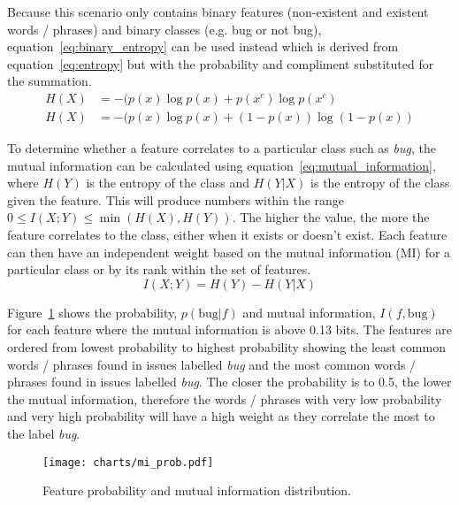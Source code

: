 Because this scenario only contains binary features (non-existent and existent words / phrases) and binary classes
(e.g. bug or not bug), equation~\ref{eq:binary_entropy} can be used instead which is derived from equation~\ref{eq:entropy} but
with the probability and compliment substituted for the summation.
\begin{equation}
    \label{eq:binary_entropy}
    \begin{split}
        H(X) &= -(p(x) \log p(x) + p(x^c)     \log p(x^c)    \\
        H(X) &= -(p(x) \log p(x) + (1 - p(x)) \log(1 - p(x))
    \end{split}
\end{equation}

To determine whether a feature correlates to a particular class such as \textit{bug}, the mutual information can be calculated
using equation~\ref{eq:mutual_information}, where $H(Y)$ is the entropy of the class and $H(Y|X)$ is the entropy of the class
given the feature. This will produce numbers within the range $0 \leq I(X;Y) \leq \min(H(X), H(Y))$. The higher the value, the
more the feature correlates to the class, either when it exists or doesn't exist. Each feature can then have an independent
weight based on the mutual information (MI) for a particular class or by its rank within the set of features.
\begin{equation}
    \label{eq:mutual_information}
    I(X;Y) = H(Y) - H(Y|X)
\end{equation}

Figure~\ref{fig:mi_prob} shows the probability, $p(\mathrm{bug}|f)$ and mutual information, $I(f,\mathrm{bug})$ for each feature
where the mutual information is above 0.13 bits. The features are ordered from lowest probability to highest probability showing
the least common words / phrases found in issues labelled \textit{bug} and the most common words / phrases found in issues
labelled \textit{bug}. The closer the probability is to 0.5, the lower the mutual information, therefore the words / phrases
with very low probability and very high probability will have a high weight as they correlate the most to the label
\textit{bug}.
\begin{figure}[h]
    \centering
    \texttt{[image: charts/mi\_prob.pdf]}
    \caption{Feature probability and mutual information distribution.}
    \label{fig:mi_prob}
\end{figure}

